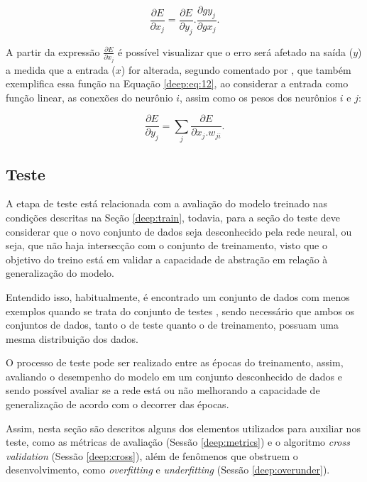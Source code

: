 \begin{equation}
    \label{deep:eq:11}
    \frac{\partial E}{\partial x_j} = \frac{\partial E}{\partial y_j} . \frac{\partial g y_j}{\partial g x_j}.
\end{equation}

A partir da expressão $\frac{\partial E}{\partial x_j}$ é possível visualizar que o erro será afetado na saída ($y$) a medida que a entrada ($x$) for alterada, segundo comentado por \cite{rumelhart1986learning}, que também exemplifica essa função na Equação \ref{deep:eq:12}, ao considerar a entrada como função linear, as conexões do neurônio $i$, assim como os pesos dos neurônios $i$ e $j$:

\begin{equation}
    \label{deep:eq:12}
    \frac{\partial E}{\partial y_j} = \sum_j \frac{\partial E}{\partial x_j . w_{ji}}.
\end{equation}


\subsection{Teste}
\label{deep:test}

A etapa de teste está relacionada com a avaliação do modelo treinado nas condições descritas na Seção \ref{deep:train}, todavia, para a seção do teste deve considerar que o novo conjunto de dados seja desconhecido pela rede neural, ou seja, que não haja intersecção com o conjunto de treinamento, visto que o objetivo do treino está em validar a capacidade de abstração em relação à generalização do modelo.

Entendido isso, habitualmente, é encontrado um conjunto de dados com menos exemplos quando se trata do conjunto de testes \cite{Goodfellow2016}, sendo necessário que ambos os conjuntos de dados, tanto o de teste quanto o de treinamento, possuam uma mesma distribuição dos dados.

O processo de teste pode ser realizado entre as épocas do treinamento, assim, avaliando o desempenho do modelo em um conjunto desconhecido de dados e sendo possível avaliar se a rede está ou não melhorando a capacidade de generalização de acordo com o decorrer das épocas.

Assim, nesta seção são descritos alguns dos elementos utilizados para auxiliar nos teste, como as métricas de avaliação (Sessão \ref{deep:metrics}) e o algoritmo \textit{cross validation} (Sessão \ref{deep:cross}), além de fenômenos que obstruem o desenvolvimento, como \textit{overfitting} e \textit{underfitting} (Sessão \ref{deep:overunder}).


